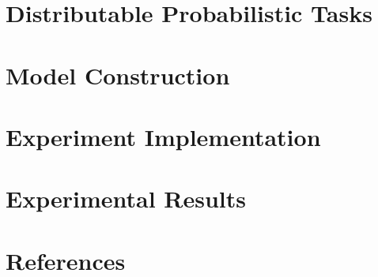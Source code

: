 \documentclass[11pt]{article}
\theoremstyle{definition}
\begin{document}
\section{Distributable Probabilistic Tasks}\label{sec:dpts}

\section{Model Construction}\label{sec:model}

\section{Experiment Implementation}\label{sec:implementation}

\section{Experimental Results}\label{sec:results}

\section{References}

\begin{thebibliography}{99}
\end{thebibliography}
\end{document}
